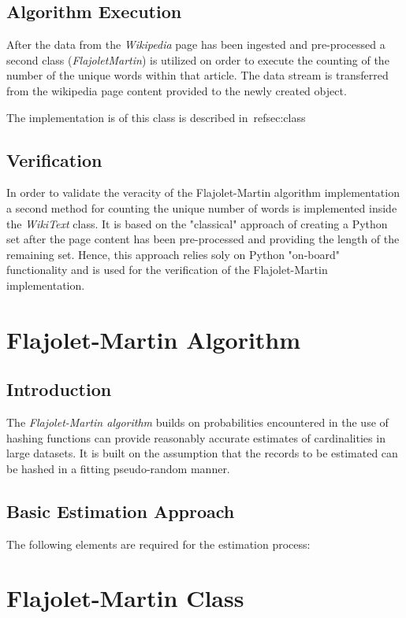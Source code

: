 \documentclass[12pt]{article}
\begin{document}
\subsection{Algorithm Execution}
After the data from the \emph{Wikipedia} page has been ingested and pre-processed a second class (\emph{FlajoletMartin}) is utilized on order to execute the counting of the number of the unique words within that article. The data stream is transferred from the wikipedia page content provided to the newly created object.

The implementation is of this class is described in~ref{sec:class}

\subsection{Verification}
In order to validate the veracity of the Flajolet-Martin algorithm implementation a second method for counting the unique number of words is implemented inside the \emph{WikiText} class. It is based on the "classical" approach of creating a Python set after the page content has been pre-processed and providing the length of the remaining set. Hence, this approach relies soly on Python "on-board" functionality and is used for the verification of the Flajolet-Martin implementation.


\section{Flajolet-Martin Algorithm}
\subsection{Introduction}
The \emph{Flajolet-Martin algorithm} builds on probabilities encountered in the use of hashing functions can provide reasonably accurate estimates of cardinalities in large datasets. It is built on the assumption that the records to be estimated can be hashed in a fitting pseudo-random manner.

\subsection{Basic Estimation Approach}
The following elements are required for the estimation process:


\section{Flajolet-Martin Class}
\label{sec:class}
\end{document}
